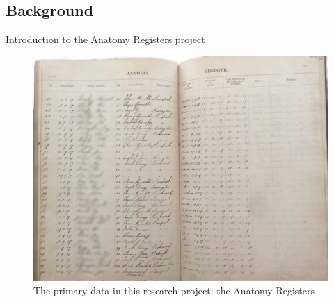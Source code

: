 \documentclass[]{beamer}
\begin{document}
	\subsection{Background}

\begin{frame}[fragile]{Introduction to the Anatomy Registers project}
	\begin{figure}
		\includegraphics[height=0.7\textheight]{img/register/serious_cursive.png}
		\caption{The primary data in this research project: the Anatomy Registers}
	\end{figure}
\end{frame}
\end{document}
